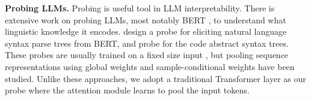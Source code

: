 \textbf{Probing LLMs.}
Probing is useful tool in LLM interpretability.
There is extensive work on probing LLMs, most notably BERT \citep{devlin-etal-2019-bert}, to understand what linguistic knowledge it encodes. \citet{hewitt2019structural} design a probe for eliciting natural language syntax parse trees from BERT, and \citet{astprobe} probe for the code abstract syntax trees.
These probes are usually trained on a fixed size input \citep{repe}, but pooling sequence representations using global weights \citep{tenney2018you} and sample-conditional weights \citep{niu2022does} have been studied. Unlike these approaches, we adopt a traditional Transformer layer as our probe where the attention module learns to pool the input tokens.

